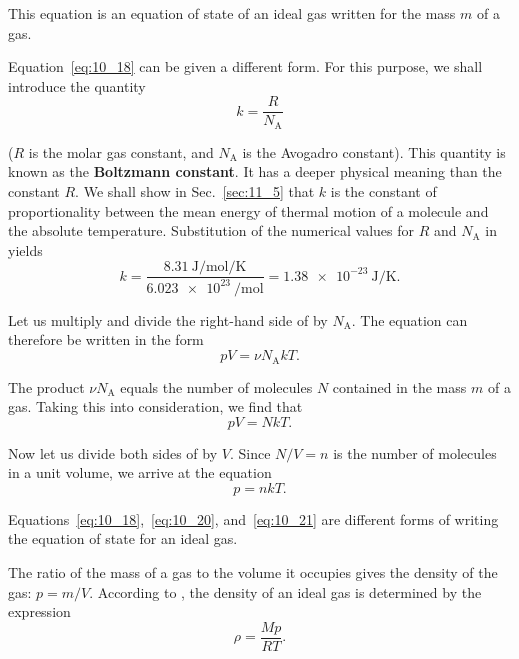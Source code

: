 \noindent
This equation is an equation of state of an ideal gas written for the mass $m$ of a gas.

Equation~\eqref{eq:10_18} can be given a different form. For this purpose, we shall introduce the quantity
\begin{equation}\label{eq:10_19}
	k = \frac{R}{N_{\text{A}}}
\end{equation}

\noindent
($R$ is the molar gas constant, and $N_{\text{A}}$ is the Avogadro constant). This quantity is known as the \textbf{Boltzmann constant}. It has a deeper physical meaning than the constant $R$. We shall show in Sec.~\ref{sec:11_5} that $k$ is the constant of proportionality between the mean energy of thermal motion of a molecule and the absolute temperature. Substitution of the numerical values for $R$ and $N_{\text{A}}$ in  yields
\begin{equation*}
	k = \frac{\SI{8.31}{\joule\per\mole\per\kelvin}}{\SI{6.023e23}{\per\mole}} = \SI{1.38e-23}{\joule\per\kelvin}.
\end{equation*}

Let us multiply and divide the right-hand side of  by $N_{\text{A}}$. The equation can therefore be written in the form
\begin{equation*}
	pV = \nu N_{\text{A}} k T.
\end{equation*}

\noindent
The product $\nu N_{\text{A}}$ equals the number of molecules $N$ contained in the mass $m$ of a gas. Taking this into consideration, we find that
\begin{equation}\label{eq:10_20}
	pV = NkT.
\end{equation}

Now let us divide both sides of  by $V$. Since $N/V=n$ is the number of molecules in a unit volume, we arrive at the equation
\begin{equation}\label{eq:10_21}
	p = nkT.
\end{equation}

Equations~\eqref{eq:10_18},~\eqref{eq:10_20}, and~\eqref{eq:10_21} are different forms of writing the equation of state for an ideal gas.

The ratio of the mass of a gas to the volume it occupies gives the density of the gas: $p = m/V$. According to , the density of an ideal gas is determined by the expression
\begin{equation}\label{eq:10_22}
	\rho = \frac{M p}{R T}.
\end{equation}

